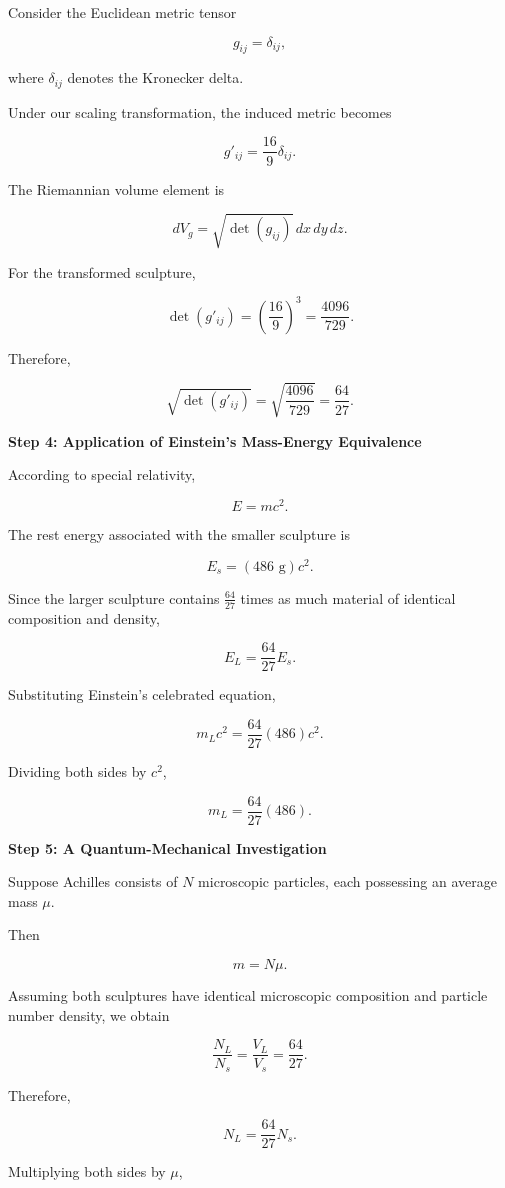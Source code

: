\begin{enumerate}
 Consider the Euclidean metric tensor

 
 \[g_{ij}=\delta_{ij},\]

 where $\delta_{ij}$ denotes the Kronecker delta.

 Under our scaling transformation, the induced metric becomes

 
 \[g'_{ij}=\frac{16}{9}\delta_{ij}.\]

 The Riemannian volume element is

 
 \[dV_g=\sqrt{\det(g_{ij})}\,dx\,dy\,dz.\]

 For the transformed sculpture,

 
 \[\det(g'_{ij})=\left(\frac{16}{9}\right)^3=\frac{4096}{729}.\]

 Therefore,

 
 \[\sqrt{\det(g'_{ij})}=\sqrt{\frac{4096}{729}}=\frac{64}{27}.\]

 \textbf{Step 4: Application of Einstein's Mass-Energy Equivalence}

 According to special relativity,

 
 \[E=mc^2.\]

 The rest energy associated with the smaller sculpture is

 
 \[E_s=(486\text{ g})c^2.\]

 Since the larger sculpture contains $\frac{64}{27}$ times as much material of identical composition and density,

 
 \[E_L=\frac{64}{27}E_s.\]

 Substituting Einstein's celebrated equation,

 
 \[m_Lc^2=\frac{64}{27}(486)c^2.\]

 Dividing both sides by $c^2$,

 
 \[m_L=\frac{64}{27}(486).\]

 \textbf{Step 5: A Quantum-Mechanical Investigation}

 Suppose Achilles consists of $N$ microscopic particles, each possessing an average mass $\mu$.

 Then

 
 \[m=N\mu.\]

 Assuming both sculptures have identical microscopic composition and particle number density, we obtain

 
 \[\frac{N_L}{N_s}=\frac{V_L}{V_s}=\frac{64}{27}.\]

 Therefore,

 
 \[N_L=\frac{64}{27}N_s.\]

 Multiplying both sides by $\mu$,


\end{enumerate}
